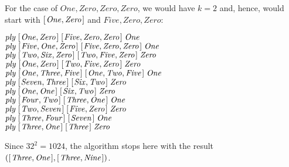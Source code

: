 \documentclass{scrreprt}
\newcommand{\Conid}[1]{\mathit{#1}}
\newcommand{\Varid}[1]{\mathit{#1}}
\begin{document}
{For the case of \ensuremath{\Conid{One},\Conid{Zero},\Conid{Zero},\Conid{Zero}},
we would have $k = 2$ and, hence, would start
with \ensuremath{[\mskip1.5mu \Conid{One},\Conid{Zero}\mskip1.5mu]} and \ensuremath{\Conid{Five},\Conid{Zero},\Conid{Zero}}:

\ensuremath{\Varid{ply}\;[\mskip1.5mu \Conid{One},\Conid{Zero}\mskip1.5mu]\;[\mskip1.5mu \Conid{Five},\Conid{Zero},\Conid{Zero}\mskip1.5mu]\;\Conid{One}}\\
\ensuremath{\Varid{ply}\;[\mskip1.5mu \Conid{Five},\Conid{One},\Conid{Zero}\mskip1.5mu]\;[\mskip1.5mu \Conid{Five},\Conid{Zero},\Conid{Zero}\mskip1.5mu]\;\Conid{One}}\\
\ensuremath{\Varid{ply}\;[\mskip1.5mu \Conid{Two},\Conid{Six},\Conid{Zero}\mskip1.5mu]\;[\mskip1.5mu \Conid{Two},\Conid{Five},\Conid{Zero}\mskip1.5mu]\;\Conid{Zero}}\\
\ensuremath{\Varid{ply}\;[\mskip1.5mu \Conid{One},\Conid{Zero}\mskip1.5mu]\;[\mskip1.5mu \Conid{Two},\Conid{Five},\Conid{Zero}\mskip1.5mu]\;\Conid{Zero}}\\
\ensuremath{\Varid{ply}\;[\mskip1.5mu \Conid{One},\Conid{Three},\Conid{Five}\mskip1.5mu]\;[\mskip1.5mu \Conid{One},\Conid{Two},\Conid{Five}\mskip1.5mu]\;\Conid{One}}\\
\ensuremath{\Varid{ply}\;[\mskip1.5mu \Conid{Seven},\Conid{Three}\mskip1.5mu]\;[\mskip1.5mu \Conid{Six},\Conid{Two}\mskip1.5mu]\;\Conid{Zero}}\\
\ensuremath{\Varid{ply}\;[\mskip1.5mu \Conid{One},\Conid{One}\mskip1.5mu]\;[\mskip1.5mu \Conid{Six},\Conid{Two}\mskip1.5mu]\;\Conid{Zero}}\\
\ensuremath{\Varid{ply}\;[\mskip1.5mu \Conid{Four},\Conid{Two}\mskip1.5mu]\;[\mskip1.5mu \Conid{Three},\Conid{One}\mskip1.5mu]\;\Conid{One}}\\
\ensuremath{\Varid{ply}\;[\mskip1.5mu \Conid{Two},\Conid{Seven}\mskip1.5mu]\;[\mskip1.5mu \Conid{Five},\Conid{Zero}\mskip1.5mu]\;\Conid{Zero}}\\
\ensuremath{\Varid{ply}\;[\mskip1.5mu \Conid{Three},\Conid{Four}\mskip1.5mu]\;[\mskip1.5mu \Conid{Seven}\mskip1.5mu]\;\Conid{One}}\\
\ensuremath{\Varid{ply}\;[\mskip1.5mu \Conid{Three},\Conid{One}\mskip1.5mu]\;[\mskip1.5mu \Conid{Three}\mskip1.5mu]\;\Conid{Zero}}

Since $32^2 = 1024$, the algorithm stops
here with the result \ensuremath{([\mskip1.5mu \Conid{Three},\Conid{One}\mskip1.5mu],[\mskip1.5mu \Conid{Three},\Conid{Nine}\mskip1.5mu])}.

}
\end{document}
